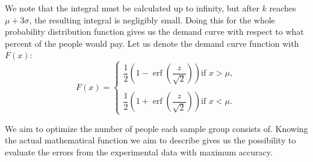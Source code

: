 \documentclass[11pt, a4paper]{article}
\theoremstyle{definition}
\begin{document}
			We note that the integral must be calculated up to infinity, but after $k$ reaches $\mu+3\sigma$, the resulting integral is negligibly small. Doing this for the whole probability distribution function gives us the demand curve with respect to what percent of the people would pay. Let us denote the demand curve function with $F(x)$:
			$$
			F(x)=
			\begin{cases}
				\dfrac{1}{2}\left (1-\operatorname{erf}\left (\dfrac{z}{\sqrt{2}}\right )\right ) \text{if } x>\mu,\\
				\\
				\dfrac{1}{2}\left (1+\operatorname{erf}\left (\dfrac{z}{\sqrt{2}}\right )\right ) \text{if } x<\mu.
			\end{cases}
			$$\par
			We aim to optimize the number of people each sample group consists of. Knowing the actual mathematical function we aim to describe gives us the possibility to evaluate the errors from the experimental data with maximum accuracy.
\end{document}
